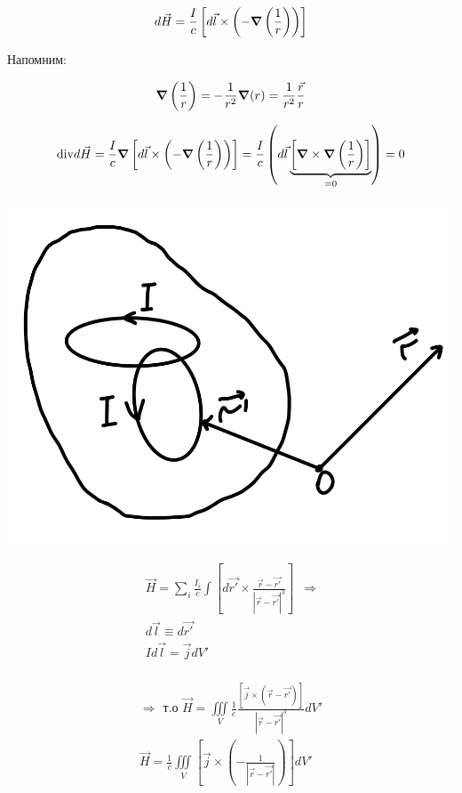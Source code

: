 \[
d\vec{H}=\frac{I}{c}\left[d\vec{l}\times \left( -\grad\left( \frac{1}{r}  \right) \right)\right] 
\]

Напомним: 

\[
\grad \left( \frac{1}{r}\right)=-\frac{1}{r^2}\grad(r)=\frac{1}{r^2}\frac{\vec{r}}{r} 
\]

\[
\mathrm{div}d\vec{H}=\frac{I}{c}\grad \left[ d\vec{l}\times \left( -\grad \left( \frac{1}{r}  \right) \right) \right]=\frac{I}{c}\left( d\vec{l} \underbrace{\left[ \grad \times \grad\left( \frac{1}{r}  \right) \right]}_{=0} \right) =0  
\]

\noindent
\begin{minipage}[c]{0.35\textwidth} %
    \includegraphics[width=\textwidth]{im/63.png}{} %
\end{minipage}%
\hfill
\begin{minipage}[c]{0.7\textwidth} %
   
    \[
    \begin{array}{l|l}
        \vec{H}=\sum_i \frac{I_i}{c}\int \left[ d\vec{r'}\times \frac{\vec{r}-\vec{r'}}{|\vec{r}-\vec{r'}|^3}  \right] & \Rightarrow \\
        d\vec{l}\equiv d\vec{r'} & \\
        Id\vec{l}=\vec{j}dV' & \\
    \end{array}
    \]

\end{minipage}

\[
\begin{array}{|l}
    \Rightarrow \text{ т.о }\vec{H}=\underset{V}{\iiint}\frac{1}{c} \frac{[\vec{j}\times (\vec{r}-\vec{r'})]}{|\vec{r}-\vec{r'}|^3}dV' \\ 
    \vec{H}= \frac{1}{c} \underset{V}{\iiint} \left[ \vec{j}\times \left( -\frac{1}{|\vec{r}-\vec{r'}|} \right) \right]dV'
\end{array}
\]

